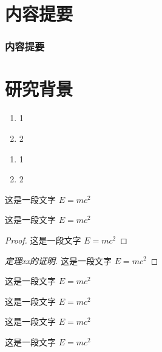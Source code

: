 \documentclass{whu-beamer}
\begin{document}
\maketitle


\section{内容提要}

\begin{frame}
  \frametitle{内容提要}
  \tableofcontents[hideallsubsections]
\end{frame}



\section{研究背景}
\begin{frame}
  \begin{enumerate}[i]
    \item 1
    \item 2
  \end{enumerate}
  \begin{enumerate}[a]
    \item 1
    \item 2
  \end{enumerate}
\end{frame}

\begin{frame}
  \begin{definition}
    这是一段文字 $E = m c^2$
  \end{definition}
  
  \begin{theorem}
    这是一段文字 $E = m c^2$
  \end{theorem}
  
  
  \begin{proof}
    这是一段文字 $E = m c^2$
  \end{proof}
  
  \begin{proof}[定理xx的证明]
    这是一段文字 $E = m c^2$
  \end{proof}
  
\end{frame}

\begin{frame}
  \begin{example}
    这是一段文字 $E = m c^2$
  \end{example}
  
  \begin{property}
    这是一段文字 $E = m c^2$
  \end{property}
  
  \begin{proposition}
    这是一段文字 $E = m c^2$
  \end{proposition}
  
  \begin{corollary}
    这是一段文字 $E = m c^2$
  \end{corollary}
\end{frame}
\end{document}
